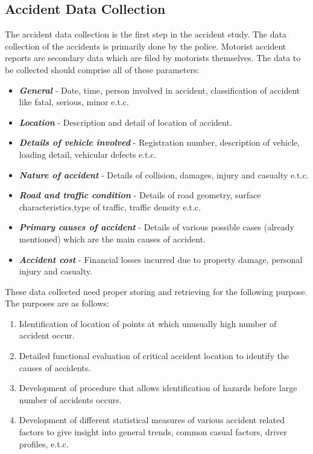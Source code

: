 \subsection{Accident Data Collection}
The accident data collection is the first step in the accident study. The data collection of the accidents is primarily done by the police. Motorist accident reports are secondary data which are filed by motorists themselves. The data to be collected should comprise all of these parameters:
\begin{itemize}
	\item \textbf{\textit{General}} - Date, time, person involved in accident, classification of accident like fatal, serious, minor e.t.c.
	\item \textbf{\textit{Location}} - Description and detail of location of accident.
	\item \textbf{\textit{Details of vehicle involved}} - Registration number, description of vehicle, loading detail, vehicular defects e.t.c.
	\item \textbf{\textit{Nature of accident}} - Details of collision, damages, injury and casualty e.t.c.
	\item \textbf{\textit{Road and traffic condition}} - Details of road geometry, surface characteristics,type of traffic, traffic density e.t.c.
	\item \textbf{\textit{Primary causes of accident}} - Details of various possible cases (already mentioned) which are the main causes of accident.
	\item \textbf{\textit{Accident cost}} - Financial losses incurred due to property damage, personal injury and casualty.
\end{itemize}
These data collected need proper storing and retrieving for the following purpose. The purposes are as follows:
\begin{enumerate}
	\item Identification of location of points at which unusually high number of accident occur.
	\item Detailed functional evaluation of critical accident location to identify the causes of accidents.
	\item Development of procedure that allows identification of hazards before large number of accidents occurs.
	\item Development of different statistical measures of various accident related factors to give insight into general trends, common casual factors, driver profiles, e.t.c.
\end{enumerate}
%
